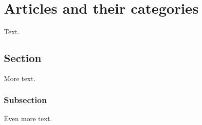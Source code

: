 \chapter{Articles and their categories\label{cha:articles}}

Text.

\section{Section}

More text.

\subsection{Subsection}

Even more text.